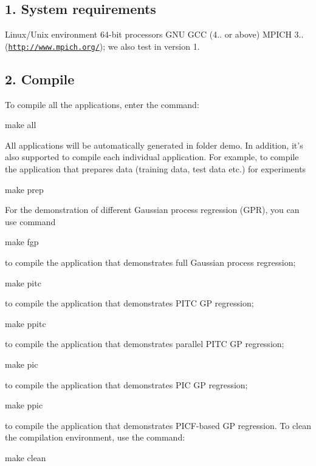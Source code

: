\subsection*{1. System requirements }

Linux/\-Unix environment 64-\/bit processors G\-N\-U G\-C\-C (4.. or above) M\-P\-I\-C\-H 3.. (\href{http://www.mpich.org/}{\tt http\-://www.\-mpich.\-org/}); we also test in version 1.

\subsection*{2. Compile }

To compile all the applications, enter the command\-: \begin{DoxyVerb}make all
\end{DoxyVerb}


All applications will be automatically generated in folder demo. In addition, it's also supported to compile each individual application. For example, to compile the application that prepares data (training data, test data etc.) for experiments

make prep

For the demonstration of different Gaussian process regression (G\-P\-R), you can use command \begin{DoxyVerb}make fgp
\end{DoxyVerb}


to compile the application that demonstrates full Gaussian process regression; \begin{DoxyVerb}make pitc 
\end{DoxyVerb}


to compile the application that demonstrates P\-I\-T\-C G\-P regression; \begin{DoxyVerb}make ppitc 
\end{DoxyVerb}


to compile the application that demonstrates parallel P\-I\-T\-C G\-P regression; \begin{DoxyVerb}make pic
\end{DoxyVerb}


to compile the application that demonstrates P\-I\-C G\-P regression; \begin{DoxyVerb}make ppic 
\end{DoxyVerb}


to compile the application that demonstrates P\-I\-C\-F-\/based G\-P regression. To clean the compilation environment, use the command\-: \begin{DoxyVerb}make clean
\end{DoxyVerb}



